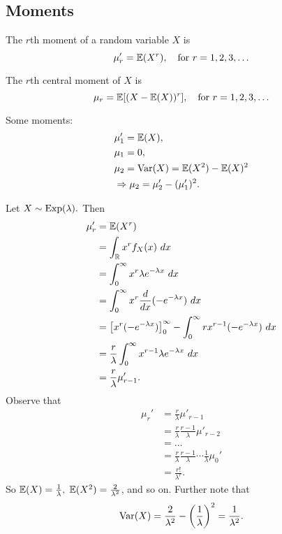 \subsection{Moments}
\begin{definition}
		The $r$th moment of a random variable $X$ is $$\mu'_r=\mathbb E(X^r), \quad \text{for } r=1,2,3,\ldots$$
\end{definition}

\begin{definition}
		The $r$th central moment of $X$ is $$\mu_r=\mathbb E[(X-\mathbb E(X))^r],\quad \text{for } r=1,2,3,\ldots$$ 
\end{definition}

\begin{eg}
Some moments:
\begin{align*}
    &\mu_1'=\mathbb E(X), \\
    &\mu_1=0, \\
    &\mu_2=\operatorname*{Var}(X)= \mathbb E(X^2)-\mathbb E(X)^2 \\
    & \Rightarrow \mu_2= \mu_2'-(\mu_1')^2.
\end{align*}
\end{eg}

\begin{eg}
Let $X\sim \operatorname*{Exp}(\lambda).$ Then
\begin{align*}
    \mu'_r&=\mathbb E(X^r) \\
    &=\int_{\mathbb R} x^r f_X(x) \ dx \\
    &=\int^\infty_0 x^r\lambda e^{-\lambda x} \ dx \\
    &= \int^\infty_0 x^r \frac{d}{dx}(-e^{-\lambda x}) \ dx \\
    &= \left[x^r(-e^{-\lambda x})\right]^\infty_0 -\int^\infty_0 r x^{r-1}(-e^{-\lambda x}) \ dx \\
    &=\frac{r}{\lambda} \int^\infty_0 x^{r-1} \lambda e^{-\lambda x} \ dx \\
    &= \frac{r}{\lambda} \mu'_{r-1}.
\end{align*}
Observe that
\begin{align*}
    \mu_r'&=\frac{r}{\lambda} \mu'_{r-1} \\
    &=\frac{r}{\lambda}\frac{r-1}{\lambda} \mu'_{r-2} \\
    &=\ldots \\
    &=\frac{r}{\lambda} \frac{r-1}{\lambda} \cdots \frac{1}{\lambda} \mu_0'\\
    &=\frac{r!}{\lambda^r}.
\end{align*}
So $\mathbb E(X)=\frac{1}{\lambda},$ $\mathbb E(X^2)=\frac{2}{\lambda^2}$, and so on. Further note that
$$
\operatorname*{Var}(X)=\frac{2}{\lambda^2}-\left(\frac{1}{\lambda}\right)^2=\frac{1}{\lambda^2}.
$$
\end{eg}
